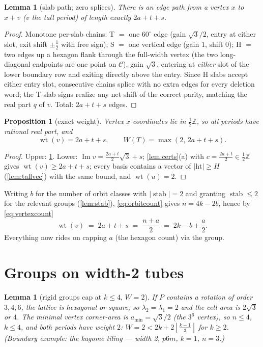 \documentclass[11pt,a4paper,oneside]{article}
\theoremstyle{plain}
\newtheorem{lemma}[theorem]{Lemma}
\newtheorem{proposition}[theorem]{Proposition}
\theoremstyle{definition}
\theoremstyle{remark}
\DeclareMathOperator{\wt}{wt}
\DeclareMathOperator{\stab}{stab}
\newcommand{\ZZ}{\mathbb{Z}}
\newcommand{\fl}[1]{\left\lfloor #1 \right\rfloor}
\newcommand{\ceilw}{2k + 2\fl{\tfrac{k-1}{3}}}
\begin{document}
\begin{lemma}[slab path; zero splices]\label{lem:slabpath}
There is an edge path from a vertex $x$ to $x + v$ ($v$ the tall period) of length exactly
$2a + t + s$.
\end{lemma}
\begin{proof}
Monotone per-slab chains: T $=$ one $60^\circ$ edge (gain $\sqrt3/2$, entry at either slot,
exit shift $\pm\tfrac12$ with free sign); S $=$ one vertical edge (gain $1$, shift $0$);
H $=$ two edges up a hexagon flank through the full-width vertex (the two long-diagonal
endpoints are one point on $\mathcal{C}$), gain $\sqrt3$, entering at \emph{either} slot of
the lower boundary row and exiting directly above the entry. Since H slabs accept either
entry slot, consecutive chains splice with no extra edges for every deletion word; the
T-slab signs realize any net shift of the correct parity, matching the real part $q$ of $v$.
Total: $2a + t + s$ edges.
\end{proof}

\begin{proposition}[exact weight]\label{prop:exactweight}
Vertex $x$-coordinates lie in $\tfrac12\ZZ$, so all periods have rational real part, and
\[
\wt(v) = 2a + t + s, \qquad
W(T) = \max(2,\, 2a + t + s).
\]
\end{proposition}
\begin{proof}
Upper: \cref{lem:slabpath}. Lower: $\operatorname{Im} v = \tfrac{2a+t}{2}\sqrt3 + s$;
\cref{lem:certs}(a) with $c = \tfrac{2a+t}{2} \in \tfrac12\ZZ$ gives $\wt(v) \ge 2a + t +
s$; every basis contains a vector of $|\mathrm{ht}| \ge H$ (\cref{lem:tallvec}) with the
same bound, and $\wt(u) = 2$.
\end{proof}

Writing $b$ for the number of orbit classes with $|\stab| = 2$ and granting $\stab \le 2$
for the relevant groups (\cref{lem:stab}), \cref{eq:orbitcount} gives $n = 4k - 2b$, hence
by \cref{eq:vertexcount}
\begin{equation}\label{eq:master}
\wt(v) \;=\; 2a + t + s \;=\; \frac{n + a}{2} \;=\; 2k - b + \frac{a}{2}.
\end{equation}
Everything now rides on capping $a$ (the hexagon count) via the group.

\section{Groups on width-2 tubes}\label{sec:groups}

\begin{lemma}[rigid groups cap at $k \le 4$, $W = 2$]\label{lem:rigid}
If $P$ contains a rotation of order $3, 4, 6$, the lattice is hexagonal or square, so
$\lambda_2 = \lambda_1 = 2$ and the cell area is $2\sqrt3$ or $4$. The minimal vertex
corner-area is $a_{\min} = \sqrt3/2$ (the $3^6$ vertex), so $n \le 4$, $k \le 4$, and both
periods have weight $2$: $W = 2 < \ceilw$ for $k \ge 2$. (Boundary example: the kagome
tiling --- width 2, $p6m$, $k = 1$, $n = 3$.)
\end{lemma}
\end{document}

